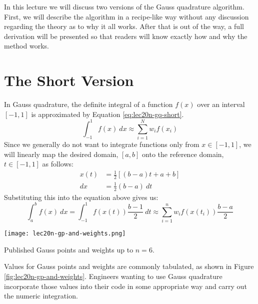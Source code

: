 In this lecture we will discuss two versions of the Gauss quadrature algorithm.  First, we will describe the algorithm in a recipe-like way without any discussion regarding the theory as to why it all works.  After that is out of the way, a full derivation will be presented so that readers will know exactly how and why the method works.

\section{The Short Version}
In Gauss quadrature, the definite integral of a function $f(x)$ over an interval $[-1,1]$ is approximated by Equation \ref{eq:lec20n-gq-short}.
\begin{equation}
\int_{-1}^{1} f(x) \ dx \approx \sum\limits_{i=1}^{N}w_i f(x_i)
\label{eq:lec20n-gq-short}
\end{equation}
Since we generally do not want to integrate functions only from $x\in[-1,1]$, we will linearly map the desired domain, $[a,b]$ onto the reference domain, $t \in [-1,1]$ as follows:
\begin{align*}
x(t) &= \frac{1}{2}\left[(b-a)t + a + b \right] \\
dx &= \frac{1}{2}(b-a) \ dt
\end{align*}
Substituting this into the equation above gives us:
\begin{equation}
\int_{a}^{b}f(x) \ dx = \int_{-1}^{1}f(x(t))\frac{b-1}{2} \ dt \approx \sum\limits_{i=1}^{n}w_i f(x(t_i))\frac{b-a}{2}
\label{eq:lec20n-gp-formula}
\end{equation}

\begin{marginfigure}
\texttt{[image: lec20n-gp-and-weights.png]}
\caption{Published Gauss points and weights up to $n=6$.}
\label{fig:lec20n-gp-and-weights}
\end{marginfigure}
Values for Gauss points and weights are commonly tabulated, as shown in Figure \ref{fig:lec20n-gp-and-weights}. Engineers wanting to use Gauss quadrature incorporate those values into their code in some appropriate way and carry out the numeric integration.

